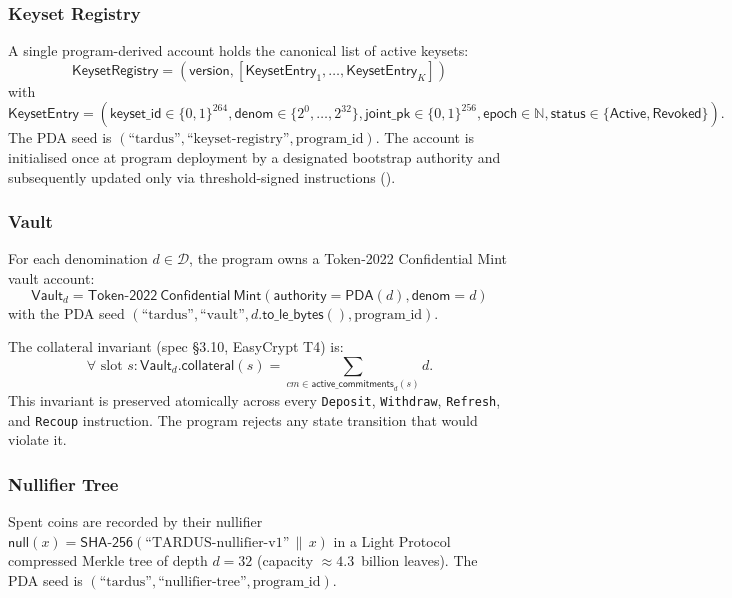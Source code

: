 \subsubsection{Keyset Registry}
\label{sec:onchain-keyset-registry}

A single program-derived account holds the canonical list of active keysets:
\[
  \mathsf{KeysetRegistry} = (\mathsf{version}, [\mathsf{KeysetEntry}_1, \ldots, \mathsf{KeysetEntry}_K])
\]
with
\[
  \mathsf{KeysetEntry} = (\mathsf{keyset\_id} \in \{0,1\}^{264}, \mathsf{denom} \in \{2^0, \ldots, 2^{32}\}, \mathsf{joint\_pk} \in \{0,1\}^{256}, \mathsf{epoch} \in \mathbb{N}, \mathsf{status} \in \{\mathsf{Active}, \mathsf{Revoked}\}).
\]
The PDA seed is $(\text{``tardus''}, \text{``keyset-registry''}, \text{program\_id})$. The account is initialised once at program deployment by a designated bootstrap authority and subsequently updated only via threshold-signed instructions ().

\subsubsection{Vault}
\label{sec:onchain-vault}

For each denomination $d \in \mathcal{D}$, the program owns a Token-2022 Confidential Mint vault account:
\[
  \mathsf{Vault}_d = \mathsf{Token\text{-}2022\ Confidential\ Mint}(\mathsf{authority}=\mathsf{PDA}(d), \mathsf{denom}=d)
\]
with the PDA seed $(\text{``tardus''}, \text{``vault''}, d.\mathsf{to\_le\_bytes}(), \text{program\_id})$.

The collateral invariant (spec §3.10, EasyCrypt T4) is:
\[
  \forall \text{ slot } s: \mathsf{Vault}_d.\mathsf{collateral}(s) = \sum_{cm \in \mathsf{active\_commitments}_d(s)} d.
\]
This invariant is preserved atomically across every \texttt{Deposit}, \texttt{Withdraw}, \texttt{Refresh}, and \texttt{Recoup} instruction. The program rejects any state transition that would violate it.

\subsubsection{Nullifier Tree}
\label{sec:onchain-nullifier-tree}

Spent coins are recorded by their nullifier $\mathsf{null}(x) = \mathsf{SHA\text{-}256}(\text{``TARDUS-nullifier-v1''} \,\|\, x)$ in a Light Protocol compressed Merkle tree of depth $d = 32$ (capacity $\approx 4.3$~billion leaves). The PDA seed is $(\text{``tardus''}, \text{``nullifier-tree''}, \text{program\_id})$.

